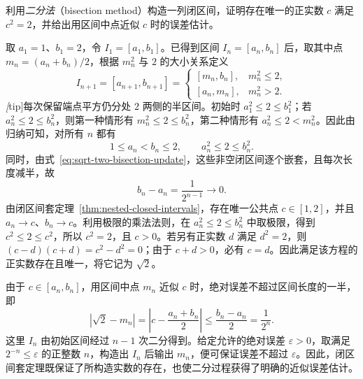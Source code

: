 \documentclass[UTF8,12pt,a4paper,fontset=fandol]{ctexbook}
\begin{document}
\begin{example}
\label{ex:sqrt-two-bisection}
利用\emph{二分法}（bisection method）构造一列闭区间，证明存在唯一的正实数 $c$ 满足 $c^2=2$，并给出用区间中点近似 $c$ 时的误差估计。
\end{example}

\begin{solve}
取 $a_1=1$、$b_1=2$，令 $I_1=[a_1,b_1]$。已得到区间 $I_n=[a_n,b_n]$ 后，取其中点 $m_n=(a_n+b_n)/2$，根据 $m_n^2$ 与 $2$ 的大小关系定义
\begin{equation}
    I_{n+1}=[a_{n+1},b_{n+1}]=
    \begin{cases}
        [m_n,b_n], & m_n^2\leq2,\\
        [a_n,m_n], & m_n^2>2.
    \end{cases}
    \label{eq:sqrt-two-bisection-update}
\end{equation}
\emph[tip]{每次保留端点平方仍分处 $2$ 两侧的半区间。}初始时 $a_1^2\leq2\leq b_1^2$；若 $a_n^2\leq2\leq b_n^2$，则第一种情形有 $m_n^2\leq2\leq b_n^2$，第二种情形有 $a_n^2\leq2<m_n^2$。因此由归纳可知，对所有 $n$ 都有
\[
    1\leq a_n<b_n\leq2,
    \qquad a_n^2\leq2\leq b_n^2.
\]
同时，由式~\eqref{eq:sqrt-two-bisection-update}，这些非空闭区间逐个嵌套，且每次长度减半，故
\[
    b_n-a_n=\frac{1}{2^{n-1}}\longrightarrow0.
\]
由闭区间套定理~\ref{thm:nested-closed-intervals}，存在唯一公共点 $c\in[1,2]$，并且 $a_n\to c$、$b_n\to c$。利用极限的乘法法则，在 $a_n^2\leq2\leq b_n^2$ 中取极限，得到 $c^2\leq2\leq c^2$，所以 $c^2=2$，且 $c>0$。若另有正实数 $d$ 满足 $d^2=2$，则 $(c-d)(c+d)=c^2-d^2=0$；由于 $c+d>0$，必有 $c=d$。因此满足该方程的正实数存在且唯一，将它记为 $\sqrt2$。

由于 $c\in[a_n,b_n]$，用区间中点 $m_n$ 近似 $c$ 时，绝对误差不超过区间长度的一半，即
\begin{equation}
    \left|\sqrt2-m_n\right|
    =\left|c-\frac{a_n+b_n}{2}\right|
    \leq\frac{b_n-a_n}{2}
    =\frac1{2^n}.
    \label{eq:sqrt-two-bisection-error}
\end{equation}
这里 $I_n$ 由初始区间经过 $n-1$ 次二分得到。给定允许的绝对误差 $\varepsilon>0$，取满足 $2^{-n}\leq\varepsilon$ 的正整数 $n$，构造出 $I_n$ 后输出 $m_n$，便可保证误差不超过 $\varepsilon$。因此，闭区间套定理既保证了所构造实数的存在，也使二分过程获得了明确的近似误差估计。
\end{solve}
\end{document}

